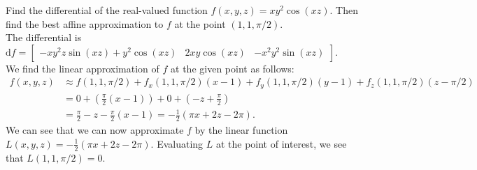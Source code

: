 \documentclass[12pt]{book}
\newenvironment{exercise}[2][Exercise]{\begin{trivlist}
\item[\hskip \labelsep {\bfseries #1}\hskip \labelsep {\bfseries #2.}]}{\end{trivlist}}
\begin{document}
\begin{exercise}{9.2.5}
	Find the differential of the real-valued function $f(x,y,z) = x y^2 \cos(x z)$. Then find the best affine approximation to $f$ at the point $(1, 1, \pi/2)$. \\
	
	The differential is $\text{d} f = \left[\begin{matrix}- x y^{2} z \sin{\left (x z \right )} + y^{2} \cos{\left (x z \right )} & 2 x y \cos{\left (x z \right )} & - x^{2} y^{2} \sin{\left (x z \right )}\end{matrix}\right]$. \\
    We find the linear approximation of $f$ at the given point as follows:
    \begin{align*}
    f(x,y,z) &\approx f(1,1,\pi/2) + f_x(1,1,\pi/2) (x-1) + f_y(1,1,\pi/2) (y-1) + f_z(1,1,\pi/2) (z-\pi/2) \\
     &= 0 + \left( \frac{\pi}{2} \left(x - 1\right) \right) + 0 + \left( - z + \frac{\pi}{2} \right) \\
     &= \frac{\pi}{2} - z - \frac{\pi}{2} \left(x - 1\right) = - \frac{1}{2} \left(\pi x + 2 z - 2 \pi\right).
    \end{align*}
    We can see that we can now approximate $f$ by the linear function $L(x,y,z) =- \frac{1}{2} \left(\pi x + 2 z - 2 \pi\right)$. Evaluating $L$ at the point of interest, we see that $L(1,1,\pi/2)=0$.
\end{exercise}
\end{document}
